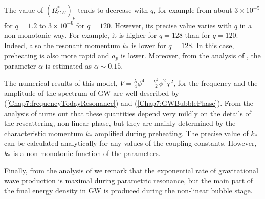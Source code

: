 \documentclass[11pt,a4paper,twoside]{book}
\begin{document}
The value of $ (\Omega_{GW}^{*})_{p} $ tends to decrease with $ q $, for example from about $ 3 \times 10^{-5} $ for $ q=1.2 $ to $ 3 \times 10^{-6} $ for $ q=120 $. However, its precise value varies with $ q $ in a non-monotonic way. For example, it is higher for $ q=128 $ than for $ q=120 $.  Indeed, also the resonant momentum $ k_{*} $ is lower for $ q=128 $. In this case, preheating is also more rapid and $ a_{p} $ is lower. Moreover, from the analysis of \cite{Chap7:GreenMethod}, the parameter $\alpha$ is estimated as $\alpha \sim 0.15$.

The numerical results of this model, $ V=\frac{\lambda}{4}\phi^{4}+\frac{g^{2}}{2}\phi^{2}\chi^{2}  $, for the frequency and the amplitude of the spectrum of GW are well described by (\ref{Chap7:frequencyTodayResonance}) and (\ref{Chap7:GWBubblePhase}). From the analysis of \cite{Chap7:GreenMethod}  turns out that these quantities depend very mildly on the details of the rescattering, non-linear phase, but they are mainly determined by the characteristic momentum $ k_{*} $ amplified during preheating. The precise value of $ k_{*} $ can be calculated analytically for any values of the coupling constants. However, $ k_* $ is a non-monotonic function of the parameters.

Finally, from the analysis of \cite{Chap7:BoxMethod} we remark that the exponential rate of gravitational wave production is maximal during parametric resonance, but the main part of the final energy density in GW is produced during the non-linear bubble stage.
\end{document}
